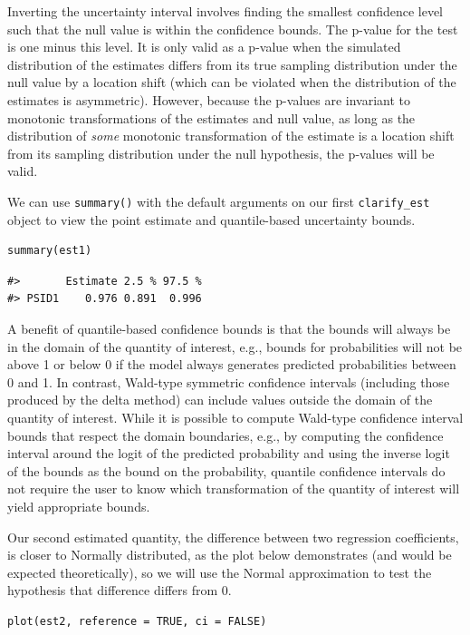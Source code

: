 Inverting the uncertainty interval involves finding the smallest confidence level such that the null value is within the confidence bounds. The p-value for the test is one minus this level. It is only valid as a p-value when the simulated distribution of the estimates differs from its true sampling distribution under the null value by a location shift (which can be violated when the distribution of the estimates is asymmetric). However, because the p-values are invariant to monotonic transformations of the estimates and null value, as long as the distribution of \emph{some} monotonic transformation of the estimate is a location shift from its sampling distribution under the null hypothesis, the p-values will be valid.

We can use \texttt{summary()} with the default arguments on our first \texttt{clarify\_est} object to view the point estimate and quantile-based uncertainty bounds.

\begin{verbatim}
summary(est1)
\end{verbatim}

\begin{verbatim}
#>       Estimate 2.5 % 97.5 %
#> PSID1    0.976 0.891  0.996
\end{verbatim}

A benefit of quantile-based confidence bounds is that the bounds will always be in the domain of the quantity of interest, e.g., bounds for probabilities will not be above 1 or below 0 if the model always generates predicted probabilities between 0 and 1. In contrast, Wald-type symmetric confidence intervals (including those produced by the delta method) can include values outside the domain of the quantity of interest. While it is possible to compute Wald-type confidence interval bounds that respect the domain boundaries, e.g., by computing the confidence interval around the logit of the predicted probability and using the inverse logit of the bounds as the bound on the probability, quantile confidence intervals do not require the user to know which transformation of the quantity of interest will yield appropriate bounds.

Our second estimated quantity, the difference between two regression coefficients, is closer to Normally distributed, as the plot below demonstrates (and would be expected theoretically), so we will use the Normal approximation to test the hypothesis that difference differs from 0.

\begin{verbatim}
plot(est2, reference = TRUE, ci = FALSE)
\end{verbatim}

